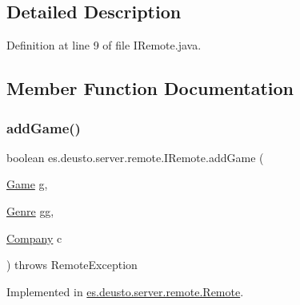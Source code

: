 \subsection{Detailed Description}


Definition at line 9 of file I\+Remote.\+java.



\subsection{Member Function Documentation}
\mbox{\label{interfacees_1_1deusto_1_1server_1_1remote_1_1_i_remote_a1875223271b9ce7a29a835fee12e735b}} 
\subsubsection{\texorpdfstring{add\+Game()}{addGame()}}
{\footnotesize\ttfamily boolean es.\+deusto.\+server.\+remote.\+I\+Remote.\+add\+Game (\begin{DoxyParamCaption}\item[{\hyperlink{classes_1_1deusto_1_1server_1_1db_1_1data_1_1_game}{Game}}]{g,  }\item[{\hyperlink{classes_1_1deusto_1_1server_1_1db_1_1data_1_1_genre}{Genre}}]{gg,  }\item[{\hyperlink{classes_1_1deusto_1_1server_1_1db_1_1data_1_1_company}{Company}}]{c }\end{DoxyParamCaption}) throws Remote\+Exception}



Implemented in \hyperlink{classes_1_1deusto_1_1server_1_1remote_1_1_remote_a1ecaa4a69094e3f3410720b54027e5b3}{es.\+deusto.\+server.\+remote.\+Remote}.

\mbox{\label{interfacees_1_1deusto_1_1server_1_1remote_1_1_i_remote_ad2e6ee616bdc780b4057e63bf2ae8be7}} 
